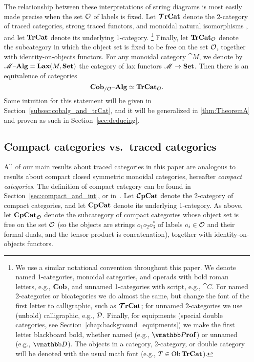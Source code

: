 \documentclass[11pt,oneside,article]{memoir}
\begin{document}
The relationship between these interpretations of string diagrams is most easily made precise when
the set $\mathcal{O}$ of labels is fixed. Let $\bm{\mathcal{T}}\mathbf{rCat}$ denote the 2-category of traced categories,
strong traced functors, and monoidal natural isomorphisms \cite{HK}, and let $\mathbf{TrCat}$ denote its
underlying 1-category.%
\footnote{
   We use a similar notational convention throughout this paper. We denote named 1-categories,
   monoidal categories, and operads with bold roman letters, e.g., $\mathbf{Cob}$, and unnamed
   1-categories with script, e.g., $\cat{C}$. For named 2-categories or bicategories we do almost
   the same, but change the font of the first letter to calligraphic, such as $\bm{\mathcal{T}}\mathbf{rCat}$; for
   unnamed 2-categories we use (unbold) calligraphic, e.g., $\mathcal{D}$. Finally, for equipments
   (special double categories, see Section~\ref{chap:background_equipments}) we make the first letter
   blackboard bold, whether named (e.g., $\ndcat{P}{rof}$) or unnamed (e.g., $\dcat{D}$). The
   objects in a category, 2-category, or double category will be denoted with the usual math font
   (e.g., $T\in\operatorname{Ob}\mathbf{TrCat}$).
}
Finally, let $\mathbf{TrCat}_{\mathcal{O}}$ denote the subcategory in which the object set is fixed to be free
on the set $\mathcal{O}$, together with identity-on-objects functors. For
any monoidal category $\cat{M}$, we denote by $\mathscr{M}{\text \textendash}\mathbf{Alg}=\mathbf{Lax}(M,\mathbf{Set})$ the category of lax
functors $\mathscr{M}\to\mathbf{Set}$. Then there is an equivalence of categories
\begin{equation}\label{eq:single_fiber_tr}
   \mathbf{Cob}_{/\mathcal{O}}{\text \textendash}\mathbf{Alg}\simeq\mathbf{TrCat}_{\mathcal{O}}.
\end{equation}
Some intuition for this statement will be given in Section~\ref{subsec:cobalg_and_trCat}, and it
will be generalized in \ref{thm:TheoremA} and proven as such in Section~\ref{sec:deducing}.

\subsection{Compact categories vs.\ traced categories}

All of our main results about traced categories in this paper are analogous to results about compact closed
symmetric monoidal categories, hereafter \emph{compact categories}. The definition of compact
category can be found in Section~\ref{sec:compact_and_int}, or in~\cite{MacLane}. Let $\bm{\mathcal{C}}\mathbf{pCat}$
denote the 2-category of compact categories, and let $\mathbf{CpCat}$ denote its underlying 1-category. As
above, let $\mathbf{CpCat}_{\mathcal{O}}$ denote the subcategory of compact categories whose object set is
free on the set $\mathcal{O}$ (so the objects are strings $o_1o_2o_3^*$ of labels $o_i\in\mathcal{O}$ and
their formal duals, and the tensor product is concatenation), together with identity-on-objects
functors.
\end{document}
